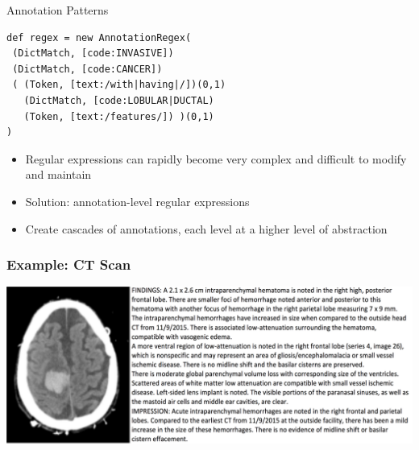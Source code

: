 \documentclass[10pt]{beamer}
\begin{document}
\begin{frame}[fragile]{Annotation Patterns}

\begin{lstlisting}[frame=single]
def regex = new AnnotationRegex(
 (DictMatch, [code:INVASIVE])
 (DictMatch, [code:CANCER])
 ( (Token, [text:/with|having|/])(0,1)
   (DictMatch, [code:LOBULAR|DUCTAL)
   (Token, [text:/features/]) )(0,1)
)
\end{lstlisting}

\begin{itemize}
	\item Regular expressions can rapidly become very complex and difficult to modify and maintain
	\item Solution: \alert{annotation-level regular expressions}
	\item Create cascades of annotations, each level at a higher level of abstraction
\end{itemize}

\end{frame}

\begin{frame}
\frametitle{Example: CT Scan}

\begin{center}
	\includegraphics[scale=0.2]{figures/ct-scan-image-and-note.png}
\end{center}


\end{frame}
\end{document}
